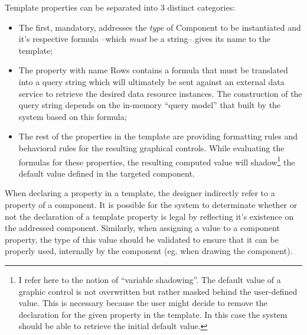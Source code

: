 Template properties can be separated into 3 distinct categories:
\begin{itemize}
    \item The first, mandatory, addresses the \emph{type} of Component to be instantiated and it's respective formula --which \emph{must} be a string-- gives its name to the template;
    \item The property with name Rows contains a formula that must be translated into a query string which will ultimately be sent against an external data service to retrieve the desired data resource instances. The construction of the query string depends on the in-memory ``query model'' that built by the system based on this formula;
    \item The rest of the properties in the template are providing formatting rules and behavioral rules for the resulting graphical controls. While evaluating the formulas for these properties, the resulting computed value will shadow\footnote{I refer here to the notion of ``variable shadowing''. The default value of a graphic control is not overwritten but rather masked behind the user-defined value. This is necessary because the user might decide to remove the declaration for the given property in the template. In this case the system should be able to retrieve the initial default value.} the default value defined in the targeted component.
\end{itemize}

When declaring a property in a template, the designer indirectly refer to a property of a component. It is possible for the system to determinate whether or not the declaration of a template property is legal by reflecting it's existence on the addressed component. Similarly, when assigning a value to a component property, the type of this value should be validated to ensure that it can be properly used, internally by the component (eg. when drawing the component).

